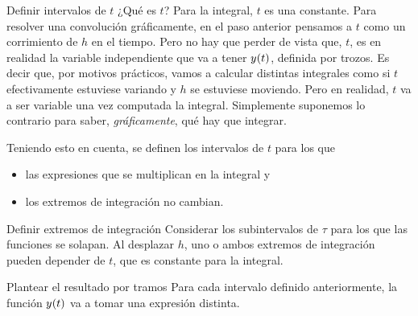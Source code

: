 \begin{numset}
    \begin{numitem}{Definir intervalos de $t$}
        ¿Qué es $t$?
        Para la integral, $t$ es una constante.
        Para resolver una convolución gráficamente, en el paso anterior pensamos a $t$ como un corrimiento de $h$ en el tiempo.
        Pero no hay que perder de vista que, $t$, es en realidad la variable independiente que va a tener $\fx[y]{t}$, definida por trozos.
        Es decir que, por motivos prácticos, vamos a calcular distintas integrales como si $t$ efectivamente estuviese variando y $h$ se estuviese moviendo.
        Pero en realidad, $t$ va a ser variable una vez computada la integral.
        Simplemente suponemos lo contrario para saber, \emph{gráficamente}, qué hay que integrar.

        Teniendo esto en cuenta, se definen los intervalos de $t$ para los que
        \begin{itemize}
            \item las expresiones que se multiplican en la integral y
            \item los extremos de integración no cambian.
        \end{itemize}
    \end{numitem}

    \begin{numitem}{Definir extremos de integración}
        Considerar los subintervalos de $\tau$ para los que las funciones se solapan.
        Al desplazar $h$, uno o ambos extremos de integración pueden depender de $t$, que es constante para la integral.
    \end{numitem}

    \begin{numitem}{Plantear el resultado por tramos}
        Para cada intervalo definido anteriormente, la función $\fx[y]{t}$ va a tomar una expresión distinta.
    \end{numitem}
\end{numset}